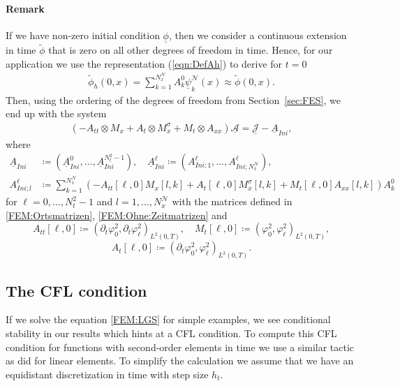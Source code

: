 \documentclass[a4paper,11pt]{article}
\renewcommand{\vec}[1]{\underline{#1}}
\begin{document}
\paragraph{Remark}
If we have non-zero initial condition $\vec \phi$, then  we consider a continuous extension in time $\tilde{\phi}$ that is zero on all other degrees of freedom in time. Hence, for our application we use the representation (\ref{eqn:DefAh}) to derive for $t=0$
\begin{align*}
	\tilde{\phi}_{h}(0,x) = \sum_{k = 1}^{N_x^{\mathcal{N}}} A_k^0 \vec{\psi}^{\mathcal{N}}_k(x)  \approx \tilde{\phi}(0,x) .
\end{align*}
Then, using the ordering of the degrees of freedom from Section~\ref{sec:FES}, we end up with the system
\begin{align}
	\label{eqn:sys_space_time_tensor}
	(-A_{tt} \otimes M_{x} + A_{t} \otimes M_{x}^{\sigma}  + M_{t} \otimes A_{xx}) \vec{ \mathcal A } =  \vec{\mathcal J}-\vec{A}_{Ini},
\end{align}
where
\begin{align*}
	\vec A_{Ini} &\coloneqq (\vec A_{Ini}^0,\dots, \vec A_{Ini}^{N_t^2-1}),\quad 
	\vec A_{Ini}^{\ell} \coloneqq (A_{Ini;1}^{\ell},\dots, A_{Ini;N_x^{\mathcal{N}}}^{\ell}),\\
	A_{Ini;l}^{\ell}&\coloneqq \sum_{k=1}^{N_x^{\mathcal{N}}} (-A_{tt}[\ell,0] M_{x}[l,k] + A_{t}[\ell,0]  M_{x}^{\sigma}[l,k]  + M_{t} [\ell,0] A_{xx}[l,k])A_k^0 
\end{align*}
for $\ell = 0,\dots, N_t^2-1 $ and $l = 1,\dots, N_x^{\mathcal{N}} $ with the matrices defined in \eqref{FEM:Ortsmatrizen}, \eqref{FEM:Ohne:Zeitmatrizen} and
\begin{equation*}
	A_{tt}[\ell,0]  \coloneqq (\partial_t \varphi^2_0, \partial_t \varphi^2_\ell)_{L^2(0,T)},\quad	
	M_{t} [\ell,0]  \coloneqq  (\varphi^2_0, \mathcal  \varphi^2_\ell)_{L^2(0,T)},
\end{equation*}
\begin{equation*}
	A_{t}[\ell,0]  	\coloneqq (\partial_t \varphi^2_0,  \varphi^2_\ell)_{L^2(0,T)}.
\end{equation*}


\subsection{The CFL condition}\label{sec:cfl-condition}
If we solve the equation \eqref{FEM:LGS} for simple examples, we see conditional stability in our results which hints at a CFL condition. To compute this CFL condition for functions with second-order elements in time we use a similar tactic as \cite{SteinbachZankETNA2020} did for linear elements. To simplify the calculation we assume that we have an equidistant discretization in time with step size $h_t$. 
\end{document}
